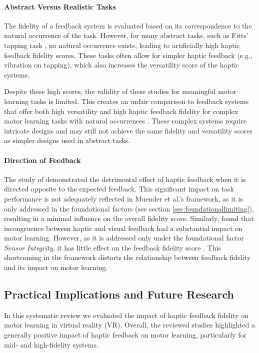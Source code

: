 \paragraph{Abstract Versus Realistic Tasks}
The fidelity of a feedback system is evaluated based on its correspondence to the natural occurrence of the task. However, for many abstract tasks, such as Fitts' tapping task \cite{Fitts1954TheMovement}, no natural occurrence exists, leading to artificially high haptic feedback fidelity scores. These tasks often allow for simpler haptic feedback (e.g., vibration on tapping), which also increases the versatility score of the haptic systems. 

Despite these high scores, the validity of these studies for meaningful motor learning tasks is limited. This creates an unfair comparison to feedback systems that offer both high versatility and high haptic feedback fidelity for complex motor learning tasks with natural occurrences \cite{LeeY2019, LiuH2019, Oezen2022}. These complex systems require intricate designs and may still not achieve the same fidelity and versatility scores as simpler designs used in abstract tasks.

\paragraph{Direction of Feedback}
The study of \cite{Macuga2019} demonstrated the detrimental effect of haptic feedback when it is directed opposite to the expected feedback. This significant impact on task performance is not adequately reflected in Muender et al.'s framework, as it is only addressed in the foundational factors (see section \ref{sec:foundationallimiting}), resulting in a minimal influence on the overall fidelity score. Similarly, \cite{Mohanty2023} found that incongruence between haptic and visual feedback had a substantial impact on motor learning. However, as it is addressed only under the foundational factor \textit{Sensor Integrity}, it has little effect on the feedback fidelity score \cite{Muender2022HapticReality}. This shortcoming in the framework distorts the relationship between feedback fidelity and its impact on motor learning.


\subsection{Practical Implications and Future Research}
In this systematic review we evaluated the impact of haptic feedback fidelity on motor learning in virtual reality (VR). Overall, the reviewed studies highlighted a generally positive impact of haptic feedback on motor learning, particularly for mid- and high-fidelity systems.

